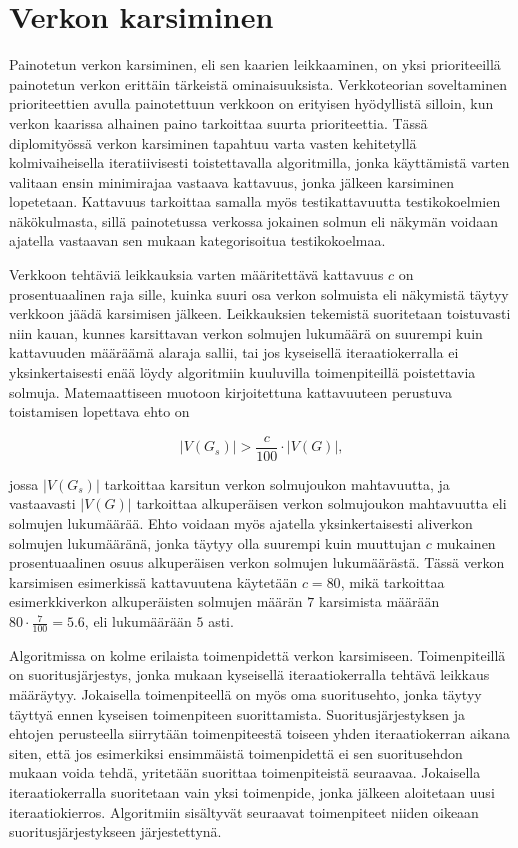 \section{Verkon karsiminen} \label{ch:10_verkon_karsiminen}

  Painotetun verkon karsiminen, eli sen kaarien leikkaaminen, on yksi prioriteeillä painotetun verkon erittäin tärkeistä ominaisuuksista.
  Verkkoteorian soveltaminen prioriteettien avulla painotettuun verkkoon on erityisen hyödyllistä silloin, kun verkon kaarissa alhainen paino tarkoittaa suurta prioriteettia.
  Tässä diplomityössä verkon karsiminen tapahtuu varta vasten kehitetyllä kolmivaiheisella iteratiivisesti toistettavalla algoritmilla, jonka käyttämistä varten valitaan ensin minimirajaa vastaava kattavuus, jonka jälkeen karsiminen lopetetaan.
  Kattavuus tarkoittaa samalla myös testikattavuutta testikokoelmien näkökulmasta, sillä painotetussa verkossa jokainen solmun eli näkymän voidaan ajatella vastaavan sen mukaan kategorisoitua testikokoelmaa.

  Verkkoon tehtäviä leikkauksia varten määritettävä kattavuus \(c\) on prosentuaalinen raja sille, kuinka suuri osa verkon solmuista eli näkymistä täytyy verkkoon jäädä karsimisen jälkeen.
  Leikkauksien tekemistä suoritetaan toistuvasti niin kauan, kunnes karsittavan verkon solmujen lukumäärä on suurempi kuin kattavuuden määräämä alaraja sallii, tai jos kyseisellä iteraatiokerralla ei yksinkertaisesti enää löydy algoritmiin kuuluvilla toimenpiteillä poistettavia solmuja.
  Matemaattiseen muotoon kirjoitettuna kattavuuteen perustuva toistamisen lopettava ehto on

  \begin{equation} \label{eq:5_6_1}
    |V(G_s)| >  \frac{c}{100} \cdot |V(G)|
    \text{,}
  \end{equation}

  jossa \(|V(G_s)|\) tarkoittaa karsitun verkon solmujoukon mahtavuutta, ja vastaavasti  \(|V(G)|\) tarkoittaa alkuperäisen verkon solmujoukon mahtavuutta eli solmujen lukumäärää.
  Ehto voidaan myös ajatella yksinkertaisesti aliverkon solmujen lukumääränä, jonka täytyy olla suurempi kuin muuttujan \(c\) mukainen prosentuaalinen osuus alkuperäisen verkon solmujen lukumäärästä.
  Tässä verkon karsimisen esimerkissä kattavuutena käytetään \(c = 80\), mikä tarkoittaa esimerkkiverkon alkuperäisten solmujen määrän \(7\) karsimista määrään \(80 \cdot \frac{7}{100} = 5.6\), eli lukumäärään \(5\) asti.

  Algoritmissa on kolme erilaista toimenpidettä verkon karsimiseen.
  Toimenpiteillä on suoritusjärjestys, jonka mukaan kyseisellä iteraatiokerralla tehtävä leikkaus määräytyy.
  Jokaisella toimenpiteellä on myös oma suoritusehto, jonka täytyy täyttyä ennen kyseisen toimenpiteen suorittamista.
  Suoritusjärjestyksen ja ehtojen perusteella siirrytään toimenpiteestä toiseen yhden iteraatiokerran aikana siten, että jos esimerkiksi ensimmäistä toimenpidettä ei sen suoritusehdon mukaan voida tehdä, yritetään suorittaa toimenpiteistä seuraavaa.
  Jokaisella iteraatiokerralla suoritetaan vain yksi toimenpide, jonka jälkeen aloitetaan uusi iteraatiokierros.
  Algoritmiin sisältyvät seuraavat toimenpiteet niiden oikeaan suoritusjärjestykseen järjestettynä.

